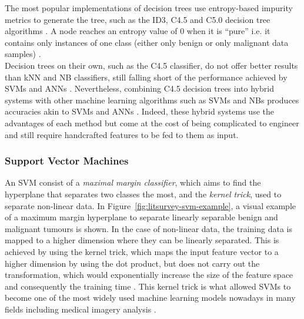 The most popular implementations of decision trees use entropy-based impurity metrics to generate the tree, such as the ID3, C4.5 and C5.0 decision tree algorithms \cite{Yue2018}. A node reaches an entropy value of 0 when it is ``pure'' i.e. it contains only instances of one class (either only benign or only malignant data samples) \cite{Geron2019}.\\

Decision trees on their own, such as the C4.5 classifier, do not offer better results than kNN and NB classifiers, still falling short of the performance achieved by SVMs \cite{Asri2016} and ANNs \cite{Yue2018}. Nevertheless, combining C4.5 decision trees into hybrid systems with other machine learning algorithms such as SVMs and NBs produces accuracies akin to SVMs and ANNs \cite{Yue2018}. Indeed, these hybrid systems use the advantages of each method but come at the cost of being complicated to engineer and still require handcrafted features to be fed to them as input.

\subsubsection{Support Vector Machines}

An SVM consist of a \textit{maximal margin classifier}, which aims to find the hyperplane that separates two classes the most, and the \textit{kernel trick}, used to separate non-linear data. In Figure~\ref{fig:litsurvey-svm-example}, a visual example of a maximum margin hyperplane to separate linearly separable benign and malignant tumours is shown. In the case of non-linear data, the training data is mapped to a higher dimension where they can be linearly separated. This is achieved by using the kernel trick, which maps the input feature vector to a higher dimension by using the dot product, but does not carry out the transformation, which would exponentially increase the size of the feature space and consequently the training time \cite{Geron2019}. This kernel trick is what allowed SVMs to become one of the most widely used machine learning models nowadays in many fields including medical imagery analysis \cite{Yue2018}.\\

